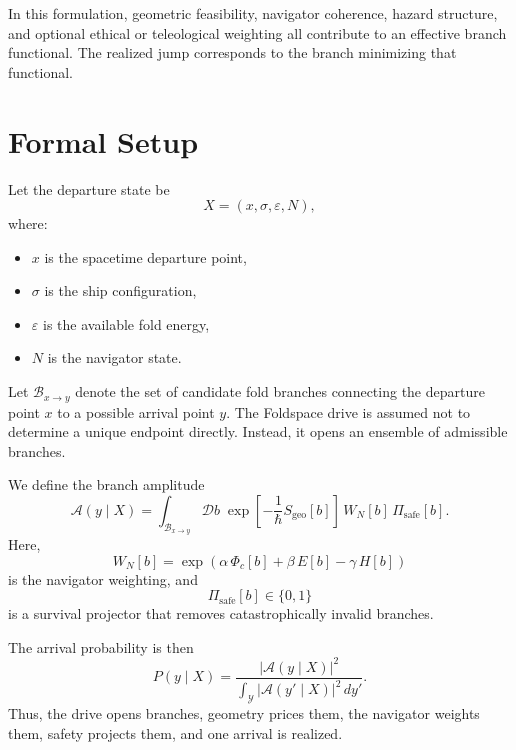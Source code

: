 \documentclass[11pt]{article}
\begin{document}
In this formulation, geometric feasibility, navigator coherence, hazard structure, and optional ethical or teleological weighting all contribute to an effective branch functional. The realized jump corresponds to the branch minimizing that functional.

\section{Formal Setup}
Let the departure state be
\begin{equation}
X = (x, \sigma, \varepsilon, N),
\end{equation}
where:
\begin{itemize}[leftmargin=2em]
    \item $x$ is the spacetime departure point,
    \item $\sigma$ is the ship configuration,
    \item $\varepsilon$ is the available fold energy,
    \item $N$ is the navigator state.
\end{itemize}

Let $\mathcal{B}_{x \rightarrow y}$ denote the set of candidate fold branches connecting the departure point $x$ to a possible arrival point $y$. The Foldspace drive is assumed not to determine a unique endpoint directly. Instead, it opens an ensemble of admissible branches.

We define the branch amplitude
\begin{equation}
\mathcal{A}(y \mid X)
=
\int_{\mathcal{B}_{x \rightarrow y}} \mathcal{D}b\;
\exp\!\left[-\frac{1}{\hbar}S_{\mathrm{geo}}[b]\right]
\, W_N[b] \, \Pi_{\mathrm{safe}}[b].
\end{equation}
Here,
\begin{equation}
W_N[b] = \exp\!\left(\alpha \, \Phi_c[b] + \beta \, E[b] - \gamma \, H[b]\right)
\end{equation}
is the navigator weighting, and
\begin{equation}
\Pi_{\mathrm{safe}}[b] \in \{0,1\}
\end{equation}
is a survival projector that removes catastrophically invalid branches.

The arrival probability is then
\begin{equation}
P(y \mid X)
=
\frac{\left|\mathcal{A}(y \mid X)\right|^2}{\displaystyle \int_{\mathcal{Y}} \left|\mathcal{A}(y' \mid X)\right|^2\, dy'}.
\end{equation}
Thus, the drive opens branches, geometry prices them, the navigator weights them, safety projects them, and one arrival is realized.
\end{document}
